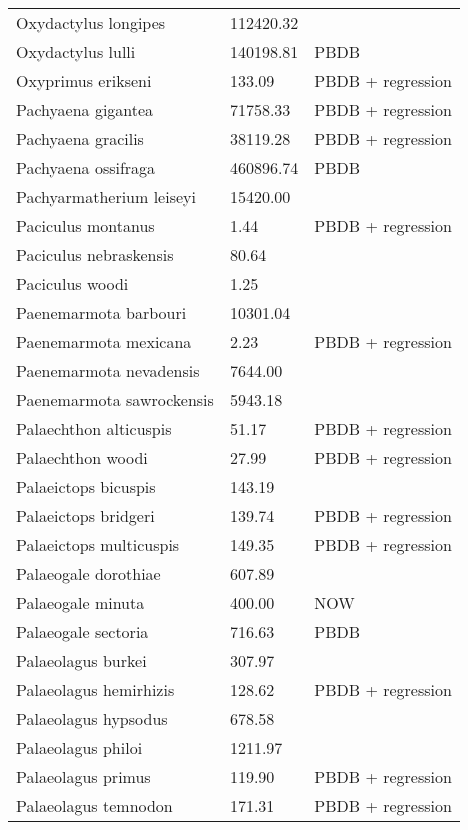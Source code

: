 \documentclass{article}
\begin{document}
\begin{center}
\begin{longtable}{p{} p{} p{}}
    Oxydactylus longipes & 112420.32 & \cite{Tomiya2013} \\ 
    Oxydactylus lulli & 140198.81 & PBDB \\ 
    Oxyprimus erikseni & 133.09 & PBDB + regression \\ 
    Pachyaena gigantea & 71758.33 & PBDB + regression \\ 
    Pachyaena gracilis & 38119.28 & PBDB + regression \\ 
    Pachyaena ossifraga & 460896.74 & PBDB \\ 
    Pachyarmatherium leiseyi & 15420.00 & \cite{McDonald2005} \\ 
    Paciculus montanus & 1.44 & PBDB + regression \\ 
    Paciculus nebraskensis & 80.64 & \cite{Tomiya2013} \\ 
    Paciculus woodi & 1.25 & \cite{Korth1993} \\ 
    Paenemarmota barbouri & 10301.04 & \cite{Tomiya2013} \\ 
    Paenemarmota mexicana & 2.23 & PBDB + regression \\ 
    Paenemarmota nevadensis & 7644.00 & \cite{McKenna2011} \\ 
    Paenemarmota sawrockensis & 5943.18 & \cite{Tomiya2013} \\ 
    Palaechthon alticuspis & 51.17 & PBDB + regression \\ 
    Palaechthon woodi & 27.99 & PBDB + regression \\ 
    Palaeictops bicuspis & 143.19 & \cite{Simons1960} \\ 
    Palaeictops bridgeri & 139.74 & PBDB + regression \\ 
    Palaeictops multicuspis & 149.35 & PBDB + regression \\ 
    Palaeogale dorothiae & 607.89 & \cite{Tomiya2013} \\ 
    Palaeogale minuta & 400.00 & NOW \\ 
    Palaeogale sectoria & 716.63 & PBDB \\ 
    Palaeolagus burkei & 307.97 & \cite{Tomiya2013} \\ 
    Palaeolagus hemirhizis & 128.62 & PBDB + regression \\ 
    Palaeolagus hypsodus & 678.58 & \cite{Tomiya2013} \\ 
    Palaeolagus philoi & 1211.97 & \cite{Tomiya2013} \\ 
    Palaeolagus primus & 119.90 & PBDB + regression \\ 
    Palaeolagus temnodon & 171.31 & PBDB + regression \\ 

\end{longtable}
\end{center}
\end{document}
